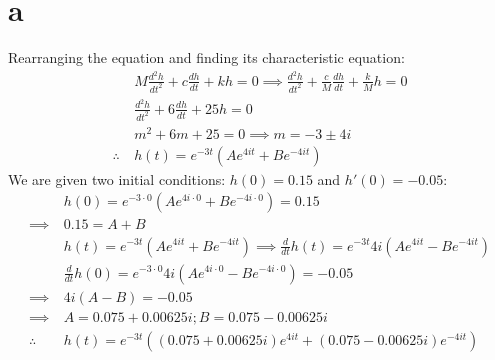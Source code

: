 \section{a}
Rearranging the equation and finding its characteristic equation:
\begin{equation*}
\begin{split}
    &M \frac{d^2h}{dt^2} + c \frac{dh}{dt} + kh = 0 \implies
        \frac{d^2h}{dt^2} + \frac{c}{M} \frac{dh}{dt} + \frac{k}{M}h = 0 \\
    &\frac{d^2h}{dt^2} + 6 \frac{dh}{dt} + 25 h = 0 \\
    & m^2 + 6m + 25 = 0 \implies m = -3 \pm 4i \\
    \therefore \ & h(t) = e^{-3t} \left( Ae^{4it} + Be^{-4it} \right)
\end{split}
\end{equation*}
We are given two initial conditions: $h(0) = 0.15$ and $h'(0) = -0.05$:
\begin{equation*}\begin{split}
    & h(0) = e^{-3\cdot 0} \left( Ae^{4i \cdot 0} + Be^{-4i \cdot 0} \right) = 0.15 \\
    \implies \ &0.15 = A + B \\
    & h(t) = e^{-3t} \left( Ae^{4it} + Be^{-4it} \right) \implies
        \frac{d}{dt}h(t) = e^{-3t}4i \left( Ae^{4it} - Be^{-4it}\right) \\
    & \frac{d}{dt}h(0) = e^{-3\cdot 0}4i \left( Ae^{4i \cdot 0} - Be^{-4i \cdot 0}\right) = -0.05 \\
    \implies \ & 4i(A-B) = -0.05 \\
    \implies &A = 0.075 + 0.00625i; B = 0.075 - 0.00625i \\
    \therefore \ &h(t) = e^{-3t} \left( (0.075 + 0.00625i)e^{4it} + (0.075 - 0.00625i)e^{-4it} \right)
\end{split}
\end{equation*}